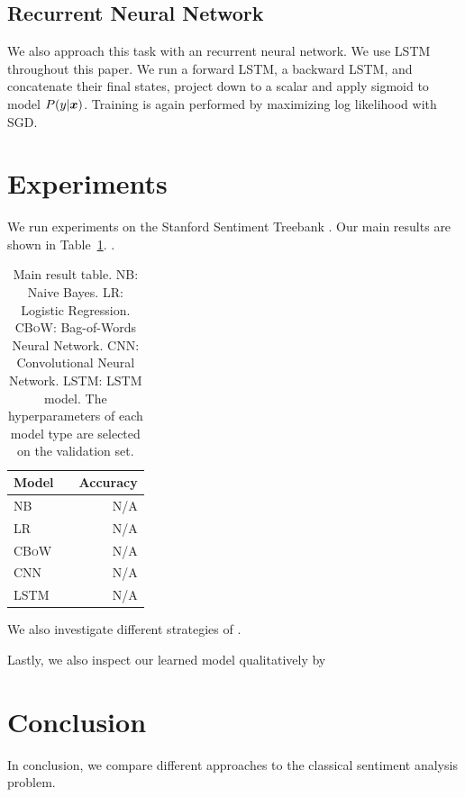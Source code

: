\documentclass[11pt]{article}
\newcommand{\todo}[1]{{\small\color{red}{\bf [*** Todo: #1]}}}
\begin{document}
\subsection{Recurrent Neural Network}
We also approach this task with an recurrent neural network. We use LSTM \citep{hochreiter1997long} throughout this paper. We run a forward LSTM, a backward LSTM, and concatenate their final states, project down to a scalar and apply sigmoid to model $P(y|\boldsymbol{x})$. Training is again performed by maximizing log likelihood with SGD.

\section{Experiments}

We run experiments on the Stanford Sentiment Treebank \citep{socher2013recursive}. Our main results are shown in Table~\ref{tab:results}. \todo{analysis}.

\begin{table}[h]
\centering
\begin{tabular}{llr}
 \toprule
 Model &  & Accuracy \\
 \midrule
 \textsc{NB}    & & N/A  \\
 \textsc{LR}    & & N/A  \\
 \textsc{CBoW}  & & N/A  \\
 \textsc{CNN}   & & N/A  \\
 \textsc{LSTM}  & & N/A  \\
 \bottomrule
\end{tabular}
\caption{\label{tab:results} Main result table. \textsc{NB}: Naive Bayes. \textsc{LR}: Logistic Regression. \textsc{CBoW}: Bag-of-Words Neural Network. \textsc{CNN}: Convolutional Neural Network. \textsc{LSTM}: LSTM model. The hyperparameters of each model type are selected on the validation set.}
\end{table}

We also investigate different strategies of \todo{binarization and other stuff}.

Lastly, we also inspect our learned model qualitatively by \todo{tensorboard visualizations of word embeddings, or learned filters?}


\section{Conclusion}

In conclusion, we compare different approaches to the classical sentiment analysis problem.

\todo{conclude}



\end{document}
